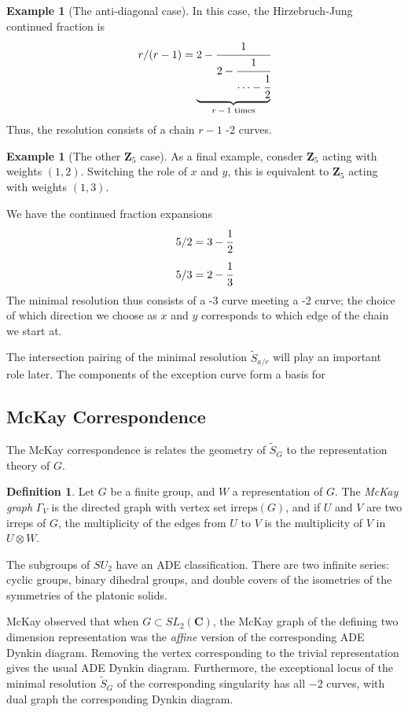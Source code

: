 \documentclass{amsart}[12pt]
\theoremstyle{definition}
\newtheorem{example}[dummy]{Example}
\newtheorem{definition}[dummy]{Definition}
\newcommand{\Z}{\mathbf{Z}}
\newcommand{\C}{\mathbf{C}}
\newcommand{\irreps}{\text{irreps}}
\begin{document}
\begin{example}[The anti-diagonal case]  
In this case, the Hirzebruch-Jung continued fraction is
$$r/(r-1)=\underbrace{2-\cfrac{1}{2-\cfrac{1}{\cdots-\cfrac{1}{2}}}}_{\text{$r-1$ times}}$$
Thus, the resolution consists of a chain $r-1$ -2 curves.
\end{example}

\begin{example}[The other $\Z_5$ case]
As a final example, consder $\Z_5$ acting with weights $(1,2)$.  Switching the role of $x$ and $y$, this is equivalent to $\Z_5$ acting with weights $(1,3)$.

We have the continued fraction expansions
$$5/2=3-\cfrac{1}{2}$$
$$5/3=2-\cfrac{1}{3}$$
The minimal resolution thus consists of a -3 curve meeting a -2 curve; the choice of which direction we choose as $x$ and $y$ corresponds to which edge of the chain we start at.
\end{example}

The intersection pairing of the minimal resolution $\widetilde{S}_{a/r}$ will play an important role later.  The components of the exception curve form a basis for 


\subsection{McKay Correspondence}
The McKay correspondence is relates the geometry of $\widetilde{S}_G$ to the representation theory of $G$.

\begin{definition}
Let $G$ be a finite group, and $W$ a representation of $G$.  The \emph{McKay graph} $\Gamma_V$ is the directed graph with vertex set $\irreps(G)$, and if $U$ and $V$ are two irreps of $G$, the multiplicity of the edges from $U$ to $V$ is the multiplicity of $V$ in $U\otimes W$.
\end{definition}

The subgroups of $SU_2$ have an ADE classification.  There are two infinite series: cyclic groups, binary dihedral groups, and double covers of the isometries of the symmetries of the platonic solids.

McKay observed \cite{McKay} that when $G\subset SL_2(\C)$, the McKay graph of the defining two dimension representation was the \emph{affine} version of the corresponding ADE Dynkin diagram.  Removing the vertex corresponding to the trivial representation gives the usual ADE Dynkin diagram.  Furthermore, the exceptional locus of the minimal resolution $\widetilde{S}_G$ of the corresponding singularity has all $-2$ curves, with dual graph the corresponding Dynkin diagram. 
\end{document}
